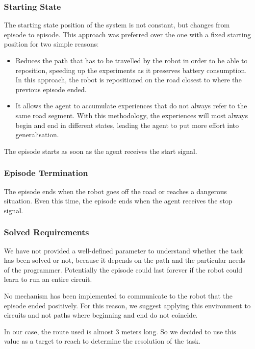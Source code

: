 \subsubsection{Starting State}

The starting state position of the system is not constant, but changes from episode to episode.
This approach was preferred over the one with a fixed starting position for two simple reasons:
\begin{itemize}
	\item Reduces the path that has to be travelled by the robot in order to be able to reposition, speeding up the experiments as it preserves battery consumption.
	      In this approach, the robot is repositioned on the road closest to where the previous episode ended.
	\item It allows the agent to accumulate experiences that do not always refer to the same road segment.
	      With this methodology, the experiences will most always begin and end in different states, leading the agent to put more effort into generalisation.
\end{itemize}

The episode starts as soon as the agent receives the start signal.

\subsubsection{Episode Termination}

The episode ends when the robot goes off the road or reaches a dangerous situation.
Even this time, the episode ends when the agent receives the stop signal.

\subsubsection{Solved Requirements}

We have not provided a well-defined parameter to understand whether the task has been solved or not, because it depends on the path and the particular needs of the programmer.
Potentially the episode could last forever if the robot could learn to run an entire circuit.

No mechanism has been implemented to communicate to the robot that the episode ended positively.
For this reason, we suggest applying this environment to circuits and not paths where beginning and end do not coincide.

In our case, the route used is almost 3 meters long.
So we decided to use this value as a target to reach to determine the resolution of the task.

